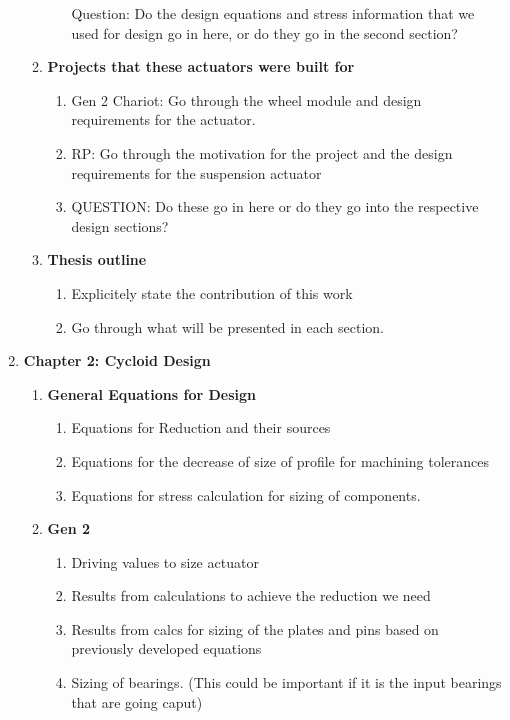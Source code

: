 \begin{enumerate}
\begin{enumerate}
\begin{enumerate}
			Question: Do the design equations and stress information that we used for design go in here, or do they go in the second section? 
		\end{enumerate}

		\item \textbf{Projects that these actuators were built for}
		\begin{enumerate}
			\item 
			Gen 2 Chariot: Go through the wheel module and design requirements for the actuator. 
			\item
			RP: Go through the motivation for the project and the design requirements for the suspension actuator 
			\item
			QUESTION: Do these go in here or do they go into the respective design sections? 
		\end{enumerate}

		\item \textbf{Thesis outline}
		\begin{enumerate}
			\item
			Explicitely state the contribution of this work
			\item
			Go through what will be presented in each section. 
		\end{enumerate}

	\end{enumerate}

	\item \textbf{Chapter 2: Cycloid Design}
	\begin{enumerate}
		\item \textbf{General Equations for Design}
		\begin{enumerate}
			\item 
			Equations for Reduction and their sources 
			\item
			Equations for the decrease of size of profile for machining tolerances 
			\item 
			Equations for stress calculation for sizing of components. 
		\end{enumerate}

		\item \textbf{Gen 2}
		\begin{enumerate}
			\item
			Driving values to size actuator 
			\item 
			Results from calculations to achieve the reduction we need 
			\item
			Results from calcs for sizing of the plates and pins based on previously developed equations 
			\item 
			Sizing of bearings. (This could be important if it is the input bearings that are going caput) 
		\end{enumerate}


\end{enumerate}
\end{enumerate}
